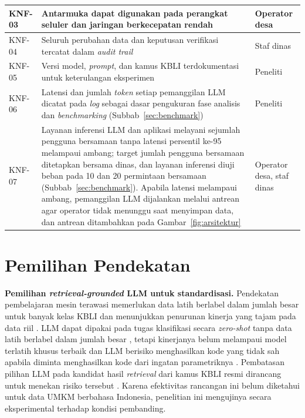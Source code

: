 {\begin{longtable}{|>{\centering\arraybackslash}p{}|L{0.62\textwidth}|L{0.20\textwidth}|}
KNF-03 & Antarmuka dapat digunakan pada perangkat seluler dan jaringan berkecepatan rendah & Operator desa \\ \hline
KNF-04 & Seluruh perubahan data dan keputusan verifikasi tercatat dalam \textit{audit trail} & Staf dinas \\ \hline
KNF-05 & Versi model, \textit{prompt}, dan kamus KBLI terdokumentasi untuk keterulangan eksperimen & Peneliti \\ \hline
KNF-06 & Latensi dan jumlah \textit{token} setiap pemanggilan LLM dicatat pada \textit{log} sebagai dasar pengukuran fase analisis dan \textit{benchmarking} (Subbab~\ref{sec:benchmark}) & Peneliti \\ \hline
KNF-07 & Layanan inferensi LLM dan aplikasi melayani sejumlah pengguna bersamaan tanpa latensi persentil ke-95 melampaui ambang; target jumlah pengguna bersamaan ditetapkan bersama dinas, dan layanan inferensi diuji beban pada 10 dan 20 permintaan bersamaan (Subbab~\ref{sec:benchmark}). Apabila latensi melampaui ambang, pemanggilan LLM dijalankan melalui antrean agar operator tidak menunggu saat menyimpan data, dan antrean ditambahkan pada Gambar~\ref{fig:arsitektur} & Operator desa, staf dinas \\ \hline
\end{longtable}
}

\section{Pemilihan Pendekatan}
\label{sec:analisis-metode}

\textbf{Pemilihan \textit{retrieval-grounded} LLM untuk standardisasi.} Pendekatan pembelajaran mesin terawasi memerlukan data latih berlabel dalam jumlah besar untuk banyak kelas KBLI dan menunjukkan penurunan kinerja yang tajam pada data riil \cite{amnur2025kbli}. LLM dapat dipakai pada tugas klasifikasi secara \textit{zero-shot} tanpa data latih berlabel dalam jumlah besar \cite{gilardi2023chatgpt,ziems2024css}, tetapi kinerjanya belum melampaui model terlatih khusus terbaik \cite{ziems2024css} dan LLM berisiko menghasilkan kode yang tidak sah apabila diminta menghasilkan kode dari ingatan parametriknya \cite{ji2023hallucination,dahl2024legal}. Pembatasan pilihan LLM pada kandidat hasil \textit{retrieval} dari kamus KBLI resmi dirancang untuk menekan risiko tersebut \cite{gao2023ragsurvey,achananuparp2025occupation}. Karena efektivitas rancangan ini belum diketahui untuk data UMKM berbahasa Indonesia, penelitian ini mengujinya secara eksperimental terhadap kondisi pembanding.


